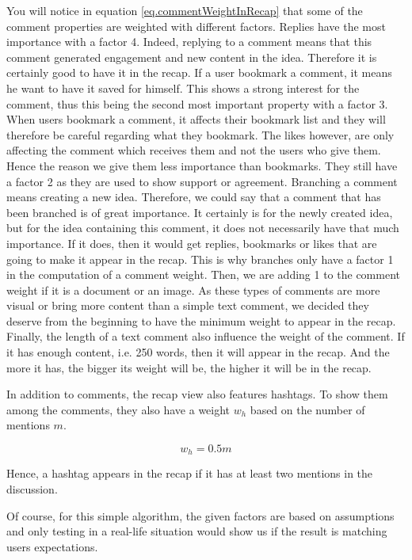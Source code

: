 \documentclass[a4paper,12pt, oneside]{article}
\begin{document}
You will notice in equation \ref{eq.commentWeightInRecap} that some of the comment properties are weighted with different factors.
Replies have the most importance with a factor 4.
Indeed, replying to a comment means that this comment generated engagement and new content in the idea.
Therefore it is certainly good to have it in the recap.
If a user bookmark a comment, it means he want to have it saved for himself.
This shows a strong interest for the comment, thus this being the second most important property with a factor 3.
When users bookmark a comment, it affects their bookmark list and they will therefore be careful regarding what they bookmark.
The likes however, are only affecting the comment which receives them and not the users who give them.
Hence the reason we give them less importance than bookmarks.
They still have a factor 2 as they are used to show support or agreement.
Branching a comment means creating a new idea.
Therefore, we could say that a comment that has been branched is of great importance.
It certainly is for the newly created idea, but for the idea containing this comment, it does not necessarily have that much importance.
If it does, then it would get replies, bookmarks or likes that are going to make it appear in the recap.
This is why branches only have a factor 1 in the computation of a comment weight.
Then, we are adding 1 to the comment weight if it is a document or an image.
As these types of comments are more visual or bring more content than a simple text comment, we decided they deserve from the beginning to have the minimum weight to appear in the recap.
Finally, the length of a text comment also influence the weight of the comment.
If it has enough content, i.e. 250 words, then it will appear in the recap.
And the more it has, the bigger its weight will be, the higher it will be in the recap.

In addition to comments, the recap view also features hashtags.
To show them among the comments, they also have a weight $w_h$ based on the number of mentions $m$.

\begin{equation}
    \label{eq.hashtagWeightInRecap}
    w_h = 0.5m
\end{equation}

Hence, a hashtag appears in the recap if it has at least two mentions in the discussion.

Of course, for this simple algorithm, the given factors are based on assumptions and only testing in a real-life situation would show us if the result is matching users expectations.
\end{document}

